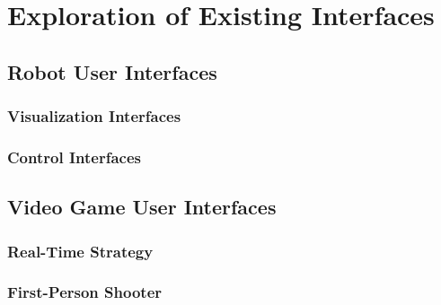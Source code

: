 \chapter{Exploration of Existing Interfaces}
\label{cpt:background}
\section{Robot User Interfaces}

\subsection{Visualization Interfaces}

\subsection{Control Interfaces}

\section{Video Game User Interfaces}

\subsection{Real-Time Strategy}

\subsection{First-Person Shooter}

